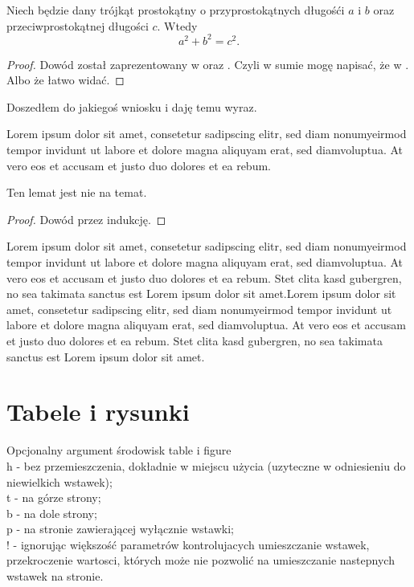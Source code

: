 \documentclass[pl]{minipw} %
\begin{document}
\begin{theorem}\label{Pitagoras}
Niech będzie dany trójkąt prostokątny o przyprostokątnych długośći $a$ i $b$ oraz przeciwprostokątnej długości $c$. Wtedy
\[
a^2 + b^2 = c^2.
\]
\end{theorem}

\begin{proof}
Dowód został zaprezentowany w \cite{Ktos} oraz \cite{Innyktos}. Czyli w sumie mogę napisać, że w \cite{Ktos, Innyktos}. Albo że łatwo widać.
\end{proof}

\begin{corollary}
Doszedłem do jakiegoś wniosku i daję temu wyraz.
\end{corollary}




\begin{remark}
Lorem ipsum dolor sit amet, consetetur sadipscing elitr, sed diam nonumyeirmod tempor invidunt ut labore et dolore magna aliquyam erat, sed diamvoluptua. At vero eos et accusam et justo duo dolores et ea rebum.
\end{remark}

\begin{lemma}[Lemacik]
Ten lemat jest nie na temat.
\end{lemma}
\begin{proof} Dowód przez indukcję.
\end{proof}


Lorem ipsum dolor sit amet, consetetur sadipscing elitr, sed diam nonumyeirmod tempor invidunt ut labore et dolore magna aliquyam erat, sed diamvoluptua. At vero eos et accusam et justo duo dolores et ea rebum. Stet clita kasd gubergren, no sea takimata sanctus est Lorem ipsum dolor sit amet.Lorem ipsum dolor sit amet, consetetur sadipscing elitr, sed diam nonumyeirmod tempor invidunt ut labore et dolore magna aliquyam erat, sed diamvoluptua. At vero eos et accusam et justo duo dolores et ea rebum. Stet clita kasd gubergren, no sea takimata sanctus est Lorem ipsum dolor sit amet.



\section{Tabele i rysunki}

 Opcjonalny argument środowisk table i figure\\
h 	- 	bez przemieszczenia, dokładnie w miejscu użycia (uzyteczne w odniesieniu do niewielkich wstawek); \\
t 	- 	na górze strony;\\
b 	- 	na dole strony;\\
p 	- 	na stronie zawierającej wyłącznie wstawki;\\
! 	- 	ignorując większość parametrów kontrolujacych umieszczanie wstawek, przekroczenie wartosci, których może nie pozwolić na umieszczanie nastepnych wstawek na stronie.
\end{document}
